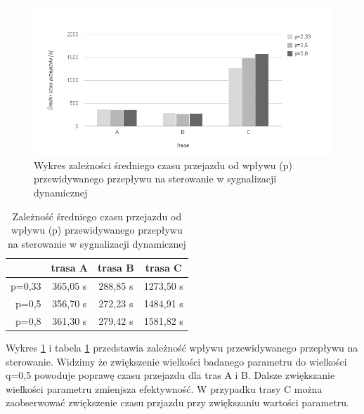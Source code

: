 \FloatBarrier
\begin{figure}[h]
    \centering
    \includegraphics[width=1.0\textwidth]{images/wykres_przewidywany_przeplyw_czas.png}
    \caption{Wykres zależności średniego czasu przejazdu od wpływu (p) przewidywanego przepływu na sterowanie w sygnalizacji dynamicznej}
    \label{fig:wykres_przewidywany_przeplyw_czas}
\end{figure}
\FloatBarrier
\begin{table}[h]
	\centering
	\begin{tabular}{ |r|c|c|c| }
		\hline
		& trasa A & trasa B & trasa C \\
		\hline
		p=0,33 & 365,05 s & 288,85 s & 1273,50 s \\
		\hline
		p=0,5 & 356,70 s & 272,23 s & 1484,91 s \\
		\hline
		p=0,8 & 361,30 s & 279,42 s & 1581,82 s \\
		\hline
	\end{tabular}
	\caption{Zależność średniego czasu przejazdu od wpływu (p) przewidywanego przepływu na sterowanie w sygnalizacji dynamicznej}
	\label{tab:wykres_przewidywany_przeplyw_czas}
\end{table}
\FloatBarrier
Wykres \ref{fig:wykres_przewidywany_przeplyw_czas} i tabela \ref{tab:wykres_przewidywany_przeplyw_czas} przedstawia zależność wpływu przewidywanego przepływu na sterowanie. Widzimy że zwiększenie wielkości badanego parametru do wielkości q=0,5 powoduje poprawę czasu przejazdu dla tras A i B. Dalsze zwiększanie wielkości parametru zmienjsza efektywność. W przypadku trasy C można zaobserwować zwiększenie czasu przjazdu przy zwiększaniu wartości parametru.


